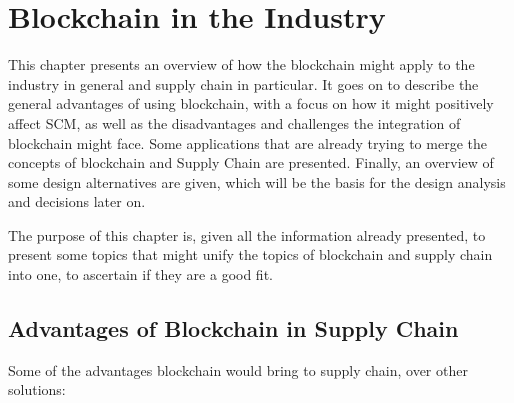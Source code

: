 \chapter{Blockchain in the Industry}
\label{chap:blockchain-applicability}

\minitoc \mtcskip \noindent

This chapter presents an overview of how the blockchain might apply to the industry in general and supply chain in particular. It goes on to describe the general advantages of using blockchain, with a focus on how it might positively affect SCM, as well as the disadvantages and challenges the integration of blockchain might face. Some applications that are already trying to merge the concepts of blockchain and Supply Chain are presented. Finally, an overview of some design alternatives are given, which will be the basis for the design analysis  and decisions later on. 

The purpose of this chapter is, given all the information already presented, to present some topics that might unify the topics of blockchain and supply chain into one, to ascertain if they are a good fit.

\section{Advantages of Blockchain in Supply Chain}

Some of the advantages blockchain would bring to supply chain, over other solutions:


